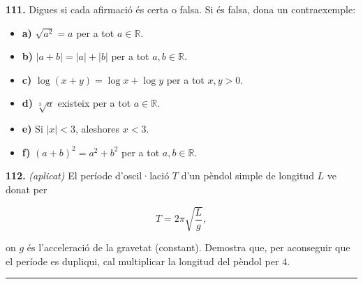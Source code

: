 \documentclass[13pt,a4paper]{extarticle}
\begin{document}
\par\noindent\begin{minipage}{\linewidth}
\textbf{111.} Digues si cada afirmació és certa o falsa. Si és falsa, dona un contraexemple:\par

\begin{itemize}[leftmargin=0pt,itemsep=3pt,topsep=3pt,parsep=0pt,label={}]
\item \textbf{a)} $\sqrt{a^2}=a$ per a tot $a\in\mathbb{R}$.
\item \textbf{b)} $|a+b|=|a|+|b|$ per a tot $a,b\in\mathbb{R}$.
\item \textbf{c)} $\log\left(x+y\right)=\log x+\log y$ per a tot $x,y>0$.
\item \textbf{d)} $\sqrt[3]{a}$ existeix per a tot $a\in\mathbb{R}$.
\item \textbf{e)} Si $|x|<3$, aleshores $x<3$.
\item \textbf{f)} $\left(a+b\right)^2=a^2+b^2$ per a tot $a,b\in\mathbb{R}$.
\end{itemize}
\end{minipage}\par\vspace{1.6mm}
\par\noindent\begin{minipage}{\linewidth}
\textbf{112.} \emph{(aplicat)} El període d'oscil·lació $T$ d'un pèndol simple de longitud $L$ ve donat per\par

$$T=2\pi\sqrt{\dfrac{L}{g}},$$\par

on $g$ és l'acceleració de la gravetat (constant). Demostra que, per aconseguir que el període es dupliqui, cal multiplicar la longitud del pèndol per $4$.\par
\end{minipage}\par\vspace{1.6mm}
\vspace{1mm}\hrule\vspace{3mm}
\end{document}
